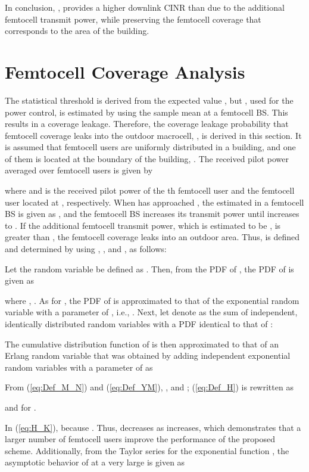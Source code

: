 \documentclass[draftclsnofoot,12pt,onecolumn]{IEEEtran}
\begin{document}
In conclusion, , provides a higher
downlink CINR than  due to the additional
femtocell transmit power, while preserving the femtocell coverage
that corresponds to the area of the building.


\section{Femtocell Coverage Analysis}
\label{sec:coverage} The statistical threshold  is derived
from the expected value , but , used for
the power control, is estimated by using the sample mean
 at a femtocell BS. This results in a coverage
leakage. Therefore, the coverage leakage probability that femtocell
coverage leaks into the outdoor macrocell, , is derived in this
section. It is assumed that  femtocell users are uniformly
distributed in a building, and one of them is located at the
boundary of the building, .
The received pilot power averaged over  femtocell users is given
by

where  and  is the received pilot power of the th
femtocell user and the femtocell user located at ,
respectively. When  has approached , the 
estimated in a femtocell BS is given as
, and the femtocell BS
increases its transmit power until  increases to
. If the additional femtocell transmit power, which is
estimated to be , is greater than
, the femtocell coverage leaks into an outdoor
area. Thus,  is defined and determined by using
, , and
, as follows:


Let the random variable  be defined as .
Then, from the PDF of , the PDF of  is given as

where ,
.
As  for , the
PDF of  is approximated to that of the exponential random
variable with a parameter of , i.e.,
.
Next, let denote  as the sum of  independent, identically
distributed random variables  with a PDF
identical to that of :

The cumulative distribution function of  is then approximated
to that of an Erlang random variable that was obtained by adding 
independent exponential random variables with a parameter of
 as \cite{Garcia}

From (\ref{eq:Def_M_N}) and (\ref{eq:Def_YM}),
, and
;
(\ref{eq:Def_H}) is rewritten as

and  for .

In (\ref{eq:H_K}), 
because . Thus,  decreases as  increases, which
demonstrates that a larger number of femtocell users improve the
performance of the proposed scheme. Additionally, from the Taylor
series for the exponential function ,
the asymptotic behavior of  at a very large  is given as
\end{document}
